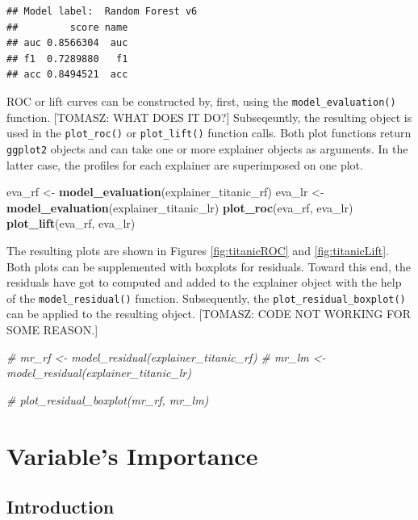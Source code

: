 \documentclass[12pt,]{krantz}
\newenvironment{Shaded}{\begin{snugshade}}{\end{snugshade}}
\newcommand{\CommentTok}[1]{\textcolor[rgb]{0.56,0.35,0.01}{\textit{#1}}}
\newcommand{\KeywordTok}[1]{\textcolor[rgb]{0.13,0.29,0.53}{\textbf{#1}}}
\newcommand{\NormalTok}[1]{#1}
\newcommand{\StringTok}[1]{\textcolor[rgb]{0.31,0.60,0.02}{#1}}
\begin{document}
\begin{verbatim}
## Model label:  Random Forest v6 
##         score name
## auc 0.8566304  auc
## f1  0.7289880   f1
## acc 0.8494521  acc
\end{verbatim}

ROC or lift curves can be constructed by, first, using the \texttt{model\_evaluation()} function. {[}TOMASZ: WHAT DOES IT DO?{]} Subseqeuntly, the resulting object is used in the \texttt{plot\_roc()} or \texttt{plot\_lift()} function calls. Both plot functions return \texttt{ggplot2} objects and can take one or more explainer objects as arguments. In the latter case, the profiles for each explainer are superimposed on one plot.

\begin{Shaded}
\begin{Highlighting}[]
\NormalTok{eva_rf <-}\StringTok{ }\KeywordTok{model_evaluation}\NormalTok{(explainer_titanic_rf)}
\NormalTok{eva_lr <-}\StringTok{ }\KeywordTok{model_evaluation}\NormalTok{(explainer_titanic_lr)}
\KeywordTok{plot_roc}\NormalTok{(eva_rf, eva_lr)}
\KeywordTok{plot_lift}\NormalTok{(eva_rf, eva_lr)}
\end{Highlighting}
\end{Shaded}

The resulting plots are shown in Figures \ref{fig:titanicROC} and \ref{fig:titanicLift}. Both plots can be supplemented with boxplots for residuals. Toward this end, the residuals have got to computed and added to the explainer object with the help of the \texttt{model\_residual()} function. Subsequently, the \texttt{plot\_residual\_boxplot()} can be applied to the resulting object. {[}TOMASZ: CODE NOT WORKING FOR SOME REASON.{]}

\begin{Shaded}
\begin{Highlighting}[]
\CommentTok{# mr_rf <- model_residual(explainer_titanic_rf)}
\CommentTok{# mr_lm <- model_residual(explainer_titanic_lr)}

\CommentTok{# plot_residual_boxplot(mr_rf, mr_lm)}
\end{Highlighting}
\end{Shaded}

\hypertarget{featureImportance}{%
\section{Variable's Importance}\label{featureImportance}}

\hypertarget{featureImportanceIntro}{%
\subsection{Introduction}\label{featureImportanceIntro}}
\end{document}
